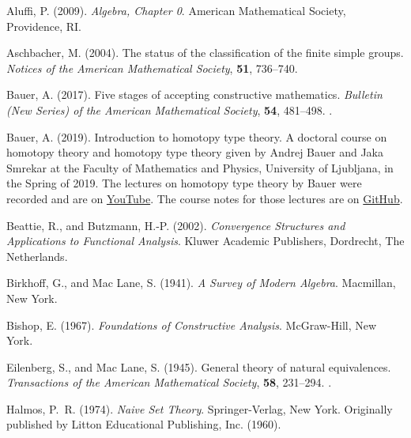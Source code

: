 \documentclass[11pt]{article}
\begin{document}
\begin{thebibliography}{}

Aluffi, P. (2009).
\newblock \emph{Algebra, Chapter 0}.
\newblock American Mathematical Society, Providence, RI.

Aschbacher, M. (2004).
\newblock The status of the classification of the finite simple groups.
\newblock \emph{Notices of the American Mathematical Society}, \textbf{51},
    736--740.

Bauer, A. (2017).
\newblock Five stages of accepting constructive mathematics.
\newblock \emph{Bulletin (New Series) of the American Mathematical Society},
    \textbf{54}, 481--498.
\newblock {}.

Bauer, A. (2019).
\newblock Introduction to homotopy type theory.
\newblock A doctoral course on homotopy theory and homotopy type theory
    given by Andrej Bauer and Jaka Smrekar at the Faculty of Mathematics
    and Physics, University of Ljubljana, in the Spring of 2019.
\newblock The lectures on homotopy type theory by Bauer were recorded
    and are on \href{https://www.youtube.com/playlist?list=PL-47DDuiZOMCRDiXDZ1fI0TFLQgQqOdDa}{YouTube}.
\newblock The course notes for those lectures are on
    \href{https://github.com/andrejbauer/homotopy-type-theory-course}{GitHub}.

Beattie, R., and Butzmann, H.-P. (2002).
\newblock \emph{Convergence Structures and Applications to Functional Analysis}.
\newblock Kluwer Academic Publishers, Dordrecht, The Netherlands.

Birkhoff, G., and Mac Lane, S. (1941).
\newblock \emph{A Survey of Modern Algebra}.
\newblock Macmillan, New York.

Bishop, E. (1967).
\newblock \emph{Foundations of Constructive Analysis}.
\newblock McGraw-Hill, New York.

Eilenberg, S., and Mac Lane, S. (1945).
\newblock General theory of natural equivalences.
\newblock \emph{Transactions of the American Mathematical Society},
    \textbf{58}, 231--294.
\newblock {}.

Halmos, P.~R. (1974).
\newblock \emph{Naive Set Theory}.
\newblock Springer-Verlag, New York.
\newblock Originally published by Litton Educational Publishing, Inc. (1960).


\end{thebibliography}
\end{document}
